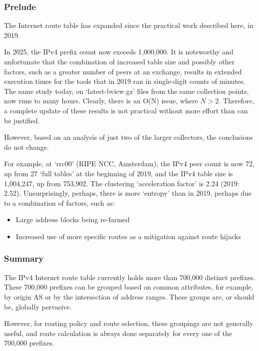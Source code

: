 \subsubsection{Prelude}

The Internet route table has expanded since the practical work described here, in 2019.

In 2025, the IPv4 prefix count now exceeds 1,000,000. It is noteworthy and unfortunate that the combination of increased table size and possibly other factors, such as a greater number of peers at an exchange, results in extended execution times for the tools that in 2019 ran in single-digit counts of minutes. The same study today, on `latest-bview.gz' files from the same collection points, now runs to many hours. Clearly, there is an O(N) issue, where $N > 2$. Therefore, a complete update of these results is not practical without more effort than can be justified.

However, based on an analysis of just two of the larger collectors, the conclusions do not change.

For example, at `rrc00' (RIPE NCC, Amsterdam), the IPv4 peer count is now 72, up from 27 `full tables' at the beginning of 2019, and the IPv4 table size is 1,004,247, up from 753,902. The clustering `acceleration factor' is 2.24 (2019: 2.52). Unsurprisingly, perhaps, there is more `entropy' than in 2019, perhaps due to a combination of factors, such as:

\begin{itemize}
	\item Large address blocks being re-farmed
	\item Increased use of more specific routes as a mitigation against route hijacks
\end{itemize}

\subsubsection{Summary}

The IPv4 Internet route table currently holds more than 700,000 distinct prefixes. These 700,000 prefixes can be grouped based on common attributes, for example, by origin AS or by the intersection of address ranges. These groups are, or should be, globally pervasive.

However, for routing policy and route selection, these groupings are not generally useful, and route calculation is always done separately for every one of the 700,000 prefixes.

